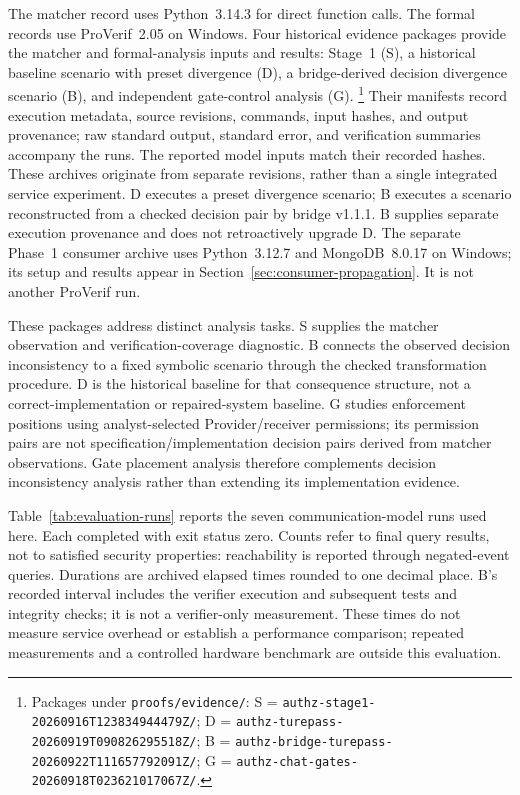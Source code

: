 The matcher record uses Python~3.14.3 for direct function calls.
The formal records use ProVerif~2.05 on Windows. Four historical evidence packages
provide the matcher and formal-analysis inputs and results: Stage~1 (S), a historical baseline scenario
with preset divergence (D), a bridge-derived decision divergence scenario (B),
and independent gate-control analysis (G).
\footnote{\raggedright Packages under
\texttt{proofs/evidence/}: S = \texttt{authz-stage1-\allowbreak
20260916T123834944479Z/}; D = \texttt{authz-turepass-\allowbreak
20260919T090826295518Z/}; B = \texttt{authz-bridge-turepass-\allowbreak
20260922T111657792091Z/}; G = \texttt{authz-chat-gates-\allowbreak
20260918T023621017067Z/}.}
Their manifests record execution metadata, source revisions, commands,
input hashes, and output provenance; raw standard output, standard error,
and verification summaries accompany the runs. The reported model inputs
match their recorded hashes. These archives originate from separate
revisions, rather than a single integrated service experiment. D executes
a preset divergence scenario; B executes a scenario reconstructed from a
checked decision pair by bridge v1.1.1. B supplies separate execution
provenance and does not retroactively upgrade D.
The separate Phase~1 consumer archive uses Python~3.12.7 and MongoDB~8.0.17
on Windows; its setup and results appear in
Section~\ref{sec:consumer-propagation}. It is not another ProVerif run.

These packages address distinct analysis tasks. S supplies the matcher
observation and verification-coverage diagnostic. B connects the observed
decision inconsistency to a fixed symbolic scenario through the checked
transformation procedure. D is the historical baseline for that consequence
structure, not a correct-implementation or repaired-system baseline. G studies
enforcement positions using analyst-selected Provider/receiver permissions;
its permission pairs are not specification/implementation decision pairs
derived from matcher observations. Gate placement analysis therefore
complements decision inconsistency analysis rather than extending its
implementation evidence.

Table~\ref{tab:evaluation-runs} reports the seven communication-model runs
used here. Each completed with exit status zero. Counts refer to final
query results, not to satisfied security properties: reachability is
reported through negated-event queries. Durations are archived elapsed
times rounded to one decimal place. B's recorded interval includes the
verifier execution and subsequent tests and integrity checks; it is not
a verifier-only measurement. These times do not measure service
overhead or establish a performance comparison; repeated measurements and
a controlled hardware benchmark are outside this evaluation.

